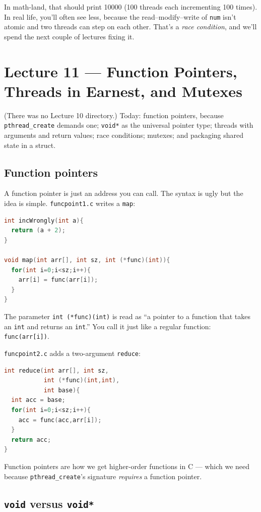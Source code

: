 \documentclass[11pt]{article}
\begin{document}
In math-land, that should print 10000 (100 threads each
incrementing 100 times). In real life, you'll often see less,
because the read--modify--write of \texttt{num} isn't atomic and
two threads can step on each other. That's a \emph{race condition},
and we'll spend the next couple of lectures fixing it.

\section{Lecture 11 --- Function Pointers, Threads in Earnest, and Mutexes}

(There was no Lecture 10 directory.) Today: function pointers,
because \texttt{pthread\_create} demands one; \texttt{void*} as the
universal pointer type; threads with arguments and return values;
race conditions; mutexes; and packaging shared state in a struct.

\subsection*{Function pointers}

A function pointer is just an address you can call. The syntax is
ugly but the idea is simple. \texttt{funcpoint1.c} writes a
\texttt{map}:

\begin{lstlisting}[language=C]
int incWrongly(int a){
  return (a + 2);
}

void map(int arr[], int sz, int (*func)(int)){
  for(int i=0;i<sz;i++){
    arr[i] = func(arr[i]);
  }
}
\end{lstlisting}

The parameter \texttt{int (*func)(int)} is read as ``a pointer to
a function that takes an \texttt{int} and returns an \texttt{int}.''
You call it just like a regular function: \texttt{func(arr[i])}.

\texttt{funcpoint2.c} adds a two-argument \texttt{reduce}:

\begin{lstlisting}[language=C]
int reduce(int arr[], int sz,
           int (*func)(int,int),
           int base){
  int acc = base;
  for(int i=0;i<sz;i++){
    acc = func(acc,arr[i]);
  }
  return acc;
}
\end{lstlisting}

Function pointers are how we get higher-order functions in C ---
which we need because \texttt{pthread\_create}'s signature
\emph{requires} a function pointer.

\subsection*{\texttt{void} versus \texttt{void*}}
\end{document}
